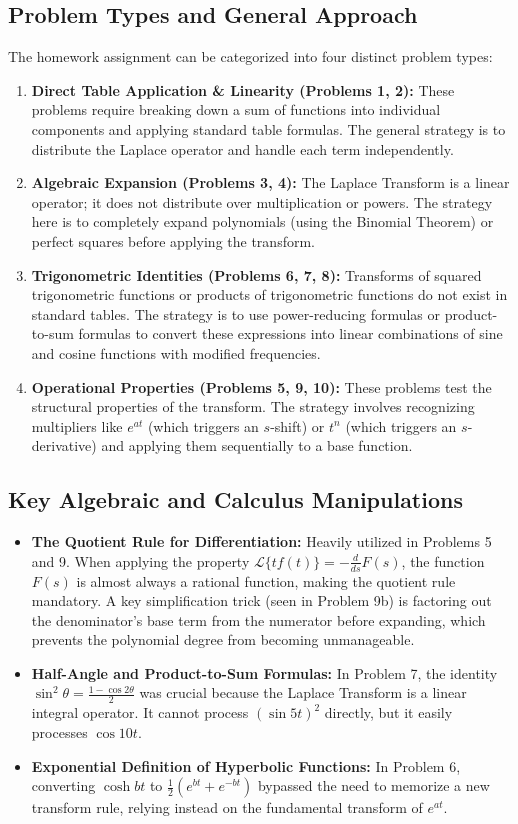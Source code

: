 \documentclass[11pt, a4paper]{article}
\theoremstyle{definition}
\theoremstyle{remark}
\begin{document}
\subsection{Problem Types and General Approach}
The homework assignment can be categorized into four distinct problem types:
\begin{enumerate}
    \item \textbf{Direct Table Application \& Linearity (Problems 1, 2):} These problems require breaking down a sum of functions into individual components and applying standard table formulas. The general strategy is to distribute the Laplace operator and handle each term independently.
    \item \textbf{Algebraic Expansion (Problems 3, 4):} The Laplace Transform is a linear operator; it does not distribute over multiplication or powers. The strategy here is to completely expand polynomials (using the Binomial Theorem) or perfect squares before applying the transform.
    \item \textbf{Trigonometric Identities (Problems 6, 7, 8):} Transforms of squared trigonometric functions or products of trigonometric functions do not exist in standard tables. The strategy is to use power-reducing formulas or product-to-sum formulas to convert these expressions into linear combinations of sine and cosine functions with modified frequencies.
    \item \textbf{Operational Properties (Problems 5, 9, 10):} These problems test the structural properties of the transform. The strategy involves recognizing multipliers like $e^{at}$ (which triggers an $s$-shift) or $t^n$ (which triggers an $s$-derivative) and applying them sequentially to a base function.
\end{enumerate}

\subsection{Key Algebraic and Calculus Manipulations}
\begin{itemize}
    \item \textbf{The Quotient Rule for Differentiation:} Heavily utilized in Problems 5 and 9. When applying the property $\mathscr{L}\{t f(t)\} = -\frac{d}{ds} F(s)$, the function $F(s)$ is almost always a rational function, making the quotient rule mandatory. A key simplification trick (seen in Problem 9b) is factoring out the denominator's base term from the numerator before expanding, which prevents the polynomial degree from becoming unmanageable.
    \item \textbf{Half-Angle and Product-to-Sum Formulas:} In Problem 7, the identity $\sin^2 \theta = \frac{1 - \cos 2\theta}{2}$ was crucial because the Laplace Transform is a linear integral operator. It cannot process $(\sin 5t)^2$ directly, but it easily processes $\cos 10t$.
    \item \textbf{Exponential Definition of Hyperbolic Functions:} In Problem 6, converting $\cosh bt$ to $\frac{1}{2}(e^{bt} + e^{-bt})$ bypassed the need to memorize a new transform rule, relying instead on the fundamental transform of $e^{at}$.
\end{itemize}
\end{document}
